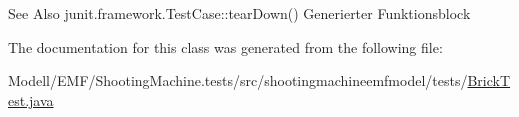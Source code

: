 \begin{DoxySeeAlso}{See Also}
junit.\-framework.\-Test\-Case\-::tear\-Down() Generierter Funktionsblock 
\end{DoxySeeAlso}


The documentation for this class was generated from the following file\-:\begin{DoxyCompactItemize}
\item 
Modell/\-E\-M\-F/\-Shooting\-Machine.\-tests/src/shootingmachineemfmodel/tests/\hyperlink{_brick_test_8java}{Brick\-Test.\-java}\end{DoxyCompactItemize}
